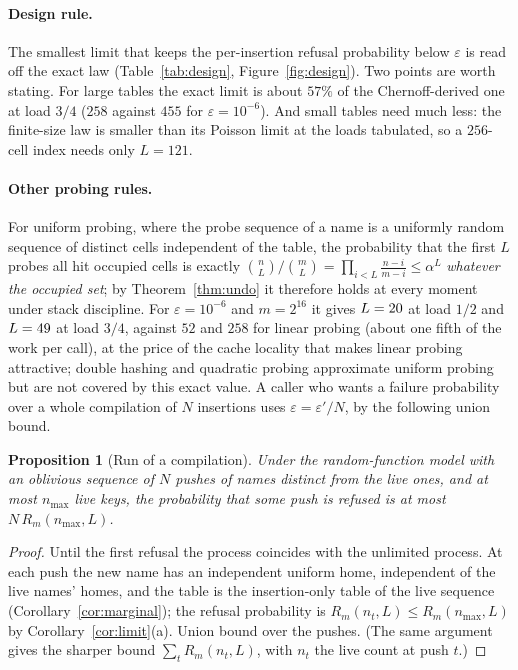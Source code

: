 \documentclass[11pt,a4paper]{article}
\newtheorem{proposition}[theorem]{Proposition}
\theoremstyle{definition}
\theoremstyle{remark}
\begin{document}
\paragraph{Design rule.} The smallest limit that keeps the per-insertion refusal probability below $\varepsilon$ is read off the exact law (Table~\ref{tab:design}, Figure~\ref{fig:design}). Two points are worth stating. For large tables the exact limit is about $57\%$ of the Chernoff-derived one at load $3/4$ ($258$ against $455$ for $\varepsilon=10^{-6}$). And small tables need much less: the finite-size law is smaller than its Poisson limit at the loads tabulated, so a $256$-cell index needs only $L=121$. \paragraph{Other probing rules.} For uniform probing, where the probe sequence of a name is a uniformly random sequence of distinct cells independent of the table, the probability that the first $L$ probes all hit occupied cells is exactly $\binom nL/\binom mL=\prod_{i<L}\frac{n-i}{m-i}\le\alpha^L$ \emph{whatever the occupied set}; by Theorem~\ref{thm:undo} it therefore holds at every moment under stack discipline. For $\varepsilon=10^{-6}$ and $m=2^{16}$ it gives $L=20$ at load $1/2$ and $L=49$ at load $3/4$, against $52$ and $258$ for linear probing (about one fifth of the work per call), at the price of the cache locality that makes linear probing attractive; double hashing and quadratic probing approximate uniform probing but are not covered by this exact value. A caller who wants a failure probability over a whole compilation of $N$ insertions uses $\varepsilon=\varepsilon'/N$, by the following union bound.

\begin{proposition}[Run of a compilation]\label{prop:run}
Under the random-function model with an oblivious sequence of $N$ pushes of names distinct from the live ones, and at most $n_{\max}$ live keys, the probability that some push is refused is at most $N\,R_m(n_{\max},L)$.
\end{proposition}
\begin{proof}
Until the first refusal the process coincides with the unlimited process. At each push the new name has an independent uniform home, independent of the live names' homes, and the table is the insertion-only table of the live sequence (Corollary~\ref{cor:marginal}); the refusal probability is $R_m(n_t,L)\le R_m(n_{\max},L)$ by Corollary~\ref{cor:limit}(a). Union bound over the pushes. (The same argument gives the sharper bound $\sum_t R_m(n_t,L)$, with $n_t$ the live count at push $t$.)
\end{proof}
\end{document}
